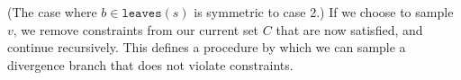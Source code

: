 %
%
%
%
(The case where $b \in \texttt{leaves}(s)$ is
symmetric to case 2.)
If we choose to sample $v$, we remove
constraints from our current set $C$ that are now satisfied,
and continue recursively.
This defines a procedure by which we can sample
a divergence branch that does not violate constraints.

